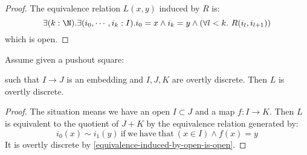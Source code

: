 \begin{proof}
The equivalence relation $L(x,y)$ induced by $R$ is:
\[\exists(k:\N). \exists(i_0,\cdots,i_k:I). i_0=x\land i_k=y \land (\forall l<k.\ R(i_l,i_{l+1})) \]
which is open.
\end{proof}

\begin{lemma}
Assume given a pushout square:
\begin{center}
\end{center}
such that $I\to J$ is an embedding and $I,J,K$ are overtly discrete. Then $L$ is overtly discrete.
\end{lemma}

\begin{proof}
The situation means we have an open $I\subset J$ and a map $f:I\to K$. Then $L$ is equivalent to the quotient of $J+K$ by the  equivalence relation generated by:
\[i_0(x) \sim i_1(y)\ \mathrm{if\ we\ have\ that}\ (x\in I)\land f(x) = y\]
It is overtly discrete by \cref{equivalence-induced-by-open-is-open}.
\end{proof}